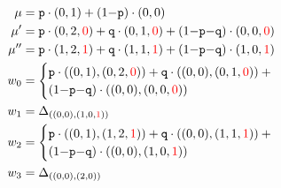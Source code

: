   {
  \begin{align*}
    \mu   &= \texttt{p}\cdot(0,1)+(1{-}\texttt{p})\cdot(0,0)\\
    \mu'  &= \texttt{p}\cdot(0,2,\textcolor{red}{0})+\texttt{q}\cdot(0,1,\textcolor{red}{0})+(1{-}\texttt{p}{-}\texttt{q})\cdot(0,0,\textcolor{red}{0})\\
    \mu'' &= \texttt{p}\cdot(1,2,\textcolor{red}{1})+\texttt{q}\cdot(1,1,\textcolor{red}{1})+(1{-}\texttt{p}{-}\texttt{q})\cdot(1,0,\textcolor{red}{1})\\
    w_0   &= \begin{cases}\texttt{p}\cdot((0,1),(0,2,\textcolor{red}{0}))+\texttt{q}\cdot((0,0),(0,1,\textcolor{red}{0}))+{}\\(1{-}\texttt{p}{-}\texttt{q})\cdot((0,0),(0,0,\textcolor{red}{0}))\end{cases}\\
    w_1   &= \Delta_{((0,0),(1,0,\textcolor{red}{1}))}\\
    w_2   &= \begin{cases}\texttt{p}\cdot((0,1),(1,2,\textcolor{red}{1}))+\texttt{q}\cdot((0,0),(1,1,\textcolor{red}{1}))+{}\\(1{-}\texttt{p}{-}\texttt{q})\cdot((0,0),(1,0,\textcolor{red}{1}))\end{cases}\\
    w_3   &= \Delta_{((0,0),(2,0))}
  \end{align*}
  }%


